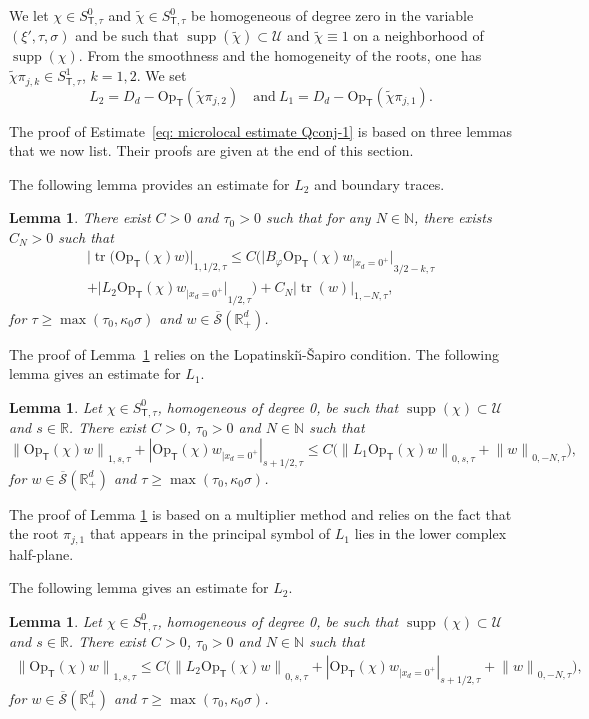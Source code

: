 \documentclass[10pt]{amsart}
\theoremstyle{plain}
\newtheorem{lemma}[theorem]{Lemma}
\theoremstyle{definition}
\def\R{\mathbb{R}}
\def\N{\mathbb{N}}
\newcommand{\LS}{Lopatinski\u{\i}-\v{S}apiro\xspace}
\newcommand{\nhd}{neighborhood\xspace}
\let\k\kappa
\newcommand{\tchi}{\tilde{\chi}}
\newcommand{\U}{\mathscr U}
\newcommand{\br}{\ensuremath{_{|x_d=0^+}}}
\newcommand{\Opt}{\ensuremath{\mathrm{Op}_{\scriptscriptstyle{\mathsf{T}}}}}
\newcommand{\Normsc}[2]{{\| #1 \|}_{#2, \tau}}
\newcommand{\normsc}[2]{{| #1 |}_{#2, \tau}}
\newcommand{\bignormsc}[2]{{\big| #1 \big|}_{#2, \tau}}
\newcommand{\Ssct}{S_{{\scriptscriptstyle{\mathsf T}},\tau}}
\newcommand{\Sbarp}{\ensuremath{\overline{\mathscr{S}}(\Rdp)}}
\newcommand{\Rdp}{\R^d_+}
\DeclareMathOperator{\supp}{supp}
\DeclareMathOperator{\trace}{tr}
\begin{document}
We let $\chi\in \Ssct^0$ and
$\tchi\in \Ssct^0$ be homogeneous of degree zero
in the variable $(\xi',\tau,\sigma)$ and be such that
$\supp(\tchi)\subset\U$ and
$\tchi\equiv 1$ on a \nhd of $\supp(\chi)$. From the smoothness and
the homogeneity of the roots, one has
$\tchi\pi_{j,k}\in \Ssct^1$, $k=1,2$. We
set
\begin{equation*}
L_2=D_d-\Opt(\tchi\pi_{j,2})
\quad \text{and} \
L_1=D_d-\Opt(\tchi\pi_{j,1}).
\end{equation*}

The proof of Estimate~\eqref{eq: microlocal estimate Qconj-1} is based on three lemmas that we now
list. Their proofs are given at the end of this section.

The following lemma provides an estimate for $L_2$ and boundary traces.

\begin{lemma}\label{lr1}
There exist $C>0$ and $\tau_0>0$ such that for any $N\in\N$, there exists $C_N>0$ such that
\begin{multline*}
\bignormsc{\trace \big(\Opt(\chi)w\big)}{1,1/2}
\leq C\big(\bignormsc{B_{\varphi}\Opt(\chi)w\br}{3/2-k}\\
+\bignormsc{L_2 \Opt(\chi)w\br}{1/2}
\big)
+C_N \normsc{\trace(w)}{1,-N},
\end{multline*}
for $\tau\geq \max(\tau_0, \k_0\sigma)$ and $w\in \Sbarp$.
\end{lemma}
The proof of Lemma~\ref{lr1} relies on the \LS condition.
The
following lemma gives an estimate for $L_1$.

\begin{lemma}\label{sl2}
Let $\chi\in \Ssct^0$, homogeneous of degree 0, be such that
$\supp(\chi)\subset\U$ and $s \in \R$. There exist $C>0$, $\tau_0>0$ and
$N\in\N$ such that
\[
\Normsc{\Opt(\chi)w}{1,s}
+\normsc{\Opt(\chi)w\br}{s+1/2}
\leq C \big(\Normsc{L_1 \Opt(\chi)w}{0,s}
+\Normsc{w}{0,-N} \big),
\]
for $w\in\Sbarp$ and $\tau\geq \max(\tau_0, \k_0\sigma)$.
\end{lemma}
The proof of Lemma \ref{sl2} is based on a multiplier method and
relies on the fact that the root $\pi_{j,1}$ that appears in the
principal symbol of $L_1$ lies in the lower complex half-plane.

The
following lemma gives an estimate for $L_2$.

\begin{lemma}\label{lemma: estimate L2}
Let $\chi\in \Ssct^0$, homogeneous of degree 0, be such that
$\supp(\chi)\subset\U$ and $s \in \R$. There exist $C>0$, $\tau_0>0$ and
$N\in\N$ such that
\begin{align*}
\Normsc{\Opt(\chi)w}{1,s}
\leq C \big(\Normsc{L_2 \Opt(\chi)w}{0,s}
+ \normsc{\Opt(\chi)w\br}{s+1/2} +\Normsc{w}{0,-N} \big),
\end{align*}
for $w\in\Sbarp$ and $\tau\geq \max(\tau_0, \k_0\sigma)$.
\end{lemma}
\end{document}
